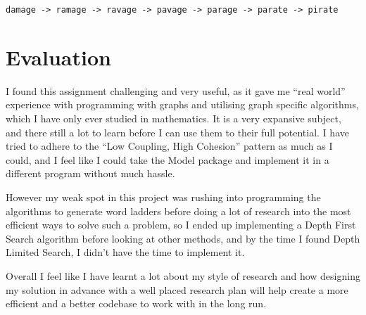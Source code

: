 \documentclass[10pt, a4paper]{article}
\begin{document}
\texttt{damage -> ramage -> ravage -> pavage -> parage -> parate -> pirate}\\


\section{Evaluation}

I found this assignment challenging and very useful, as it gave me “real world” experience with programming with graphs and utilising graph specific algorithms, which I have only ever studied in mathematics. It is a very expansive subject, and there still a lot to learn before I can use them to their full potential.  I have tried to adhere to the “Low Coupling, High Cohesion” pattern as much as I could, and I feel like I could take the Model package and implement it in a different program without much hassle. 

However my weak spot in this project was rushing into programming the algorithms to generate word ladders before doing a lot of research into the most efficient ways to solve such a problem, so  I ended up implementing a Depth First Search algorithm before looking at other methods, and by the time I found Depth Limited Search, I didn’t have the time to implement it.

Overall I feel like I have learnt a lot about my style of research and how designing my solution in advance with a well placed research plan will help create a more efficient and a better codebase to work with in the long run.
\end{document}

